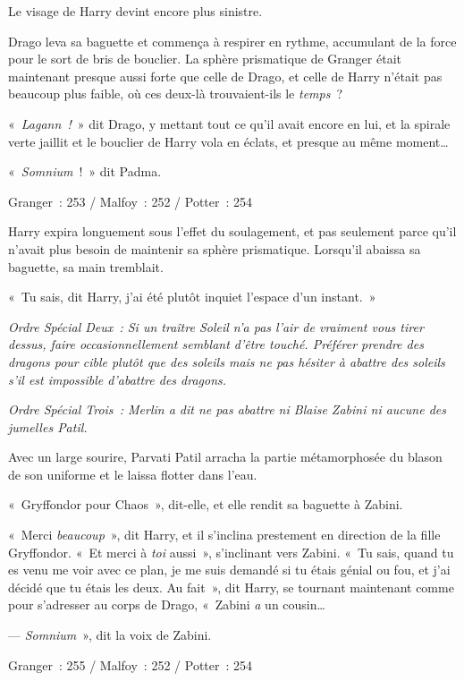 Le visage de Harry devint encore plus sinistre.

Drago leva sa baguette et commença à respirer en rythme, accumulant de la force pour le sort de bris de bouclier. La sphère prismatique de Granger était maintenant presque aussi forte que celle de Drago, et celle de Harry n'était pas beaucoup plus faible, où ces deux-là trouvaient-ils le \emph{temps}~?

«~\emph{Lagann~!}~» dit Drago, y mettant tout ce qu'il avait encore en lui, et la spirale verte jaillit et le bouclier de Harry vola en éclats, et presque au même moment…

«~\emph{Somnium}~!~» dit Padma.

\later

Granger~: 253 / Malfoy~: 252 / Potter~: 254

Harry expira longuement sous l'effet du soulagement, et pas seulement parce qu'il n'avait plus besoin de maintenir sa sphère prismatique. Lorsqu'il abaissa sa baguette, sa main tremblait.

«~Tu sais, dit Harry, j'ai été plutôt inquiet l'espace d'un instant.~»

\emph{Ordre Spécial Deux~: Si un traître Soleil n'a pas l'air de vraiment vous tirer dessus, faire occasionnellement semblant d'être touché. Préférer prendre des dragons pour cible plutôt que des soleils mais ne pas hésiter à abattre des soleils s'il est impossible d'abattre des dragons.}

\emph{Ordre Spécial Trois~: Merlin a dit ne pas abattre ni Blaise Zabini ni aucune des jumelles Patil.}

Avec un large sourire, Parvati Patil arracha la partie métamorphosée du blason de son uniforme et le laissa flotter dans l'eau.

«~Gryffondor pour Chaos~», dit-elle, et elle rendit sa baguette à Zabini.

«~Merci \emph{beaucoup}~», dit Harry, et il s'inclina prestement en direction de la fille Gryffondor. «~Et merci à \emph{toi} aussi~», s'inclinant vers Zabini. «~Tu sais, quand tu es venu me voir avec ce plan, je me suis demandé si tu étais génial ou fou, et j'ai décidé que tu étais les deux. Au fait~», dit Harry, se tournant maintenant comme pour s'adresser au corps de Drago, «~Zabini \emph{a} un cousin…

--- \emph{Somnium}~», dit la voix de Zabini.

\later

Granger~: 255 / Malfoy~: 252 / Potter~: 254


